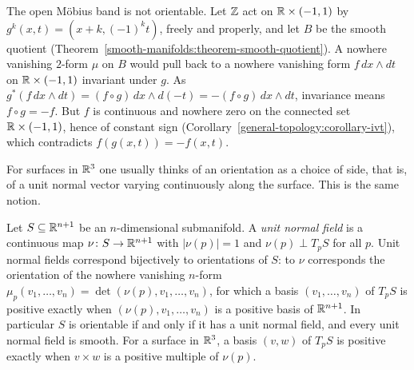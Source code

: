 \begin{counterexample}\label{differential-forms:counterexample-mobius}
The open M\"obius band is not orientable. Let $\mathbb{Z}$ act on $\mathbb{R} \times (-1, 1)$ by $g^k(x, t) = (x + k, (-1)^kt)$, freely and properly, and let $B$ be the smooth quotient (Theorem~\ref{smooth-manifolds:theorem-smooth-quotient}). A
nowhere vanishing $2$-form $\mu$ on $B$ would pull back to a nowhere vanishing form $f\,dx \wedge dt$ on $\mathbb{R} \times (-1, 1)$ invariant under $g$. As $g^*(f\,dx \wedge dt) = (f \circ g)\,dx \wedge d(-t) = -(f \circ g)\,dx \wedge dt$,
invariance means $f \circ g = -f$. But $f$ is continuous and nowhere zero on the connected set $\mathbb{R} \times (-1, 1)$, hence of constant sign (Corollary~\ref{general-topology:corollary-ivt}), which contradicts $f(g(x, t)) = -f(x, t)$.
\end{counterexample}

For surfaces in $\mathbb{R}^3$ one usually thinks of an orientation as a choice of side, that is, of a unit normal vector varying continuously along the surface. This is
the same notion.

\begin{proposition}\label{differential-forms:proposition-orientation-normal}
Let $S \subseteq \mathbb{R}^{n+1}$ be an $n$-dimensional submanifold. A \emph{unit normal field} is a continuous map $\nu \colon S \to \mathbb{R}^{n+1}$ with $|\nu(p)| = 1$ and
$\nu(p) \perp T_pS$ for all $p$. Unit normal fields correspond bijectively to orientations of $S$: to $\nu$ corresponds the orientation of the nowhere vanishing
$n$-form $\mu_p(v_1, \ldots, v_n) = \det(\nu(p), v_1, \ldots, v_n)$, for which a basis $(v_1, \ldots, v_n)$ of $T_pS$ is positive exactly when $(\nu(p), v_1, \ldots, v_n)$ is a
positive basis of $\mathbb{R}^{n+1}$. In particular $S$ is orientable if and only if it has a unit normal field, and every unit normal field is smooth. For a surface in $\mathbb{R}^3$, a
basis $(v, w)$ of $T_pS$ is positive exactly when $v \times w$ is a positive multiple of $\nu(p)$.
\end{proposition}

